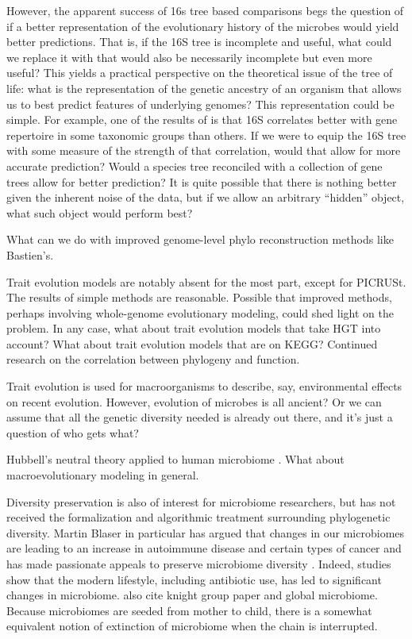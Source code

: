 \documentclass{amsart}
\begin{document}
However, the apparent success of 16s tree based comparisons begs the question of if a better representation of the evolutionary history of the microbes would yield better predictions.
That is, if the 16S tree is incomplete and useful, what could we replace it with that would also be necessarily incomplete but even more useful?
This yields a practical perspective on the theoretical issue of the tree of life: what is the representation of the genetic ancestry of an organism that allows us to best predict features of underlying genomes?
This representation could be simple.
For example, one of the results of \citet{zaneveld2010ribosomal} is that 16S correlates better with gene repertoire in some taxonomic groups than others.
If we were to equip the 16S tree with some measure of the strength of that correlation, would that allow for more accurate prediction?
Would a species tree reconciled with a collection of gene trees allow for better prediction?
It is quite possible that there is nothing better given the inherent noise of the data, but if we allow an arbitrary ``hidden'' object, what such object would perform best?

What can we do with improved genome-level phylo reconstruction methods like Bastien's.

Trait evolution models are notably absent for the most part, except for PICRUSt.
The results of simple methods are reasonable.
Possible that improved methods, perhaps involving whole-genome evolutionary modeling, could shed light on the problem.
In any case, what about trait evolution models that take HGT into account?
What about trait evolution models that are on KEGG?
Continued research on the correlation between phylogeny and function.

Trait evolution is used for macroorganisms to describe, say, environmental effects on recent evolution.
However, evolution of microbes is all ancient?
Or we can assume that all the genetic diversity needed is already out there, and it's just a question of who gets what?

Hubbell's neutral theory applied to human microbiome \citep{fierer2012animalcules,costello2012application}.
What about macroevolutionary modeling in general.

Diversity preservation is also of interest for microbiome researchers, but has not received the formalization and algorithmic treatment surrounding phylogenetic diversity.
Martin Blaser in particular has argued that changes in our microbiomes are leading to an increase in autoimmune disease and certain types of cancer and has made passionate appeals to preserve microbiome diversity \cite{blaser2011antibiotic,cho2012human}.
Indeed, studies show that the modern lifestyle, including antibiotic use, has led to significant changes in microbiome.
\cite{tito2012insights} also cite knight group paper and global microbiome.
Because microbiomes are seeded from mother to child, there is a somewhat equivalent notion of extinction of microbiome when the chain is interrupted.
\end{document}
